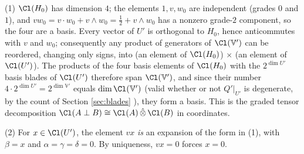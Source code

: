(1) $\Cl(H_0)$ has dimension $4$; the elements $1, v, w_0$ are independent (grades $0$ and $1$), and $v w_0 = v \cdot w_0 + v \wedge w_0 = \tfrac12 + v \wedge w_0$ has a nonzero grade-$2$ component, so the four are a basis. Every vector of $U'$ is orthogonal to $H_0$, hence anticommutes with $v$ and $w_0$; consequently any product of generators of $\Cl(\mathbb{V}')$ can be reordered, changing only signs, into (an element of $\Cl(H_0)$)$\,\times\,$(an element of $\Cl(U')$). The products of the four basis elements of $\Cl(H_0)$ with the $2^{\dim U'}$ basis blades of $\Cl(U')$ therefore span $\Cl(\mathbb{V}')$, and since their number $4 \cdot 2^{\dim U'} = 2^{\dim \mathbb{V}'}$ equals $\dim \Cl(\mathbb{V}')$ (valid whether or not $Q'|_{U'}$ is degenerate, by the count of Section \ref{sec:blades} \cite{Chevalley1997}), they form a basis. This is the graded tensor decomposition $\Cl(A \perp B) \cong \Cl(A)\,\hat{\otimes}\,\Cl(B)$ \cite{Lam2005} in coordinates.

(2) For $x \in \Cl(U')$, the element $vx$ \emph{is} an expansion of the form in (1), with $\beta = x$ and $\alpha = \gamma = \delta = 0$. By uniqueness, $vx = 0$ forces $x = 0$.
